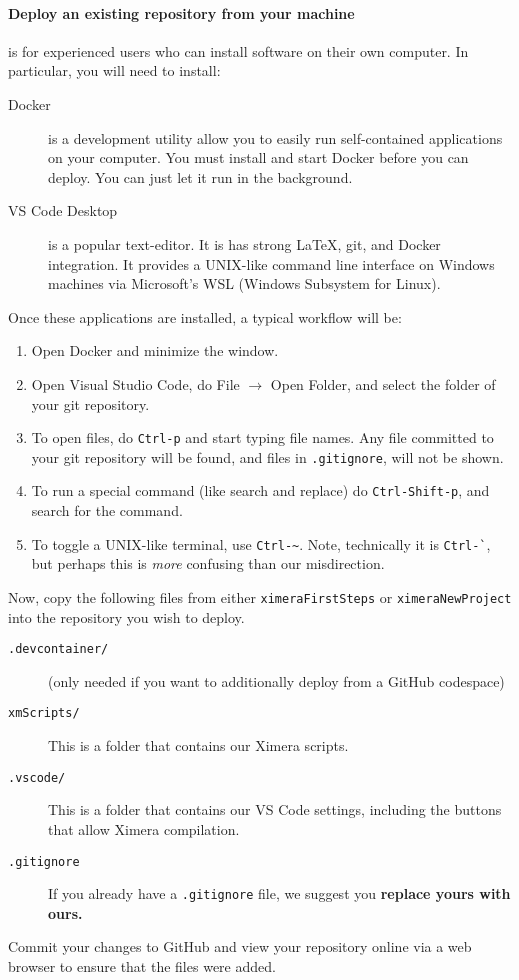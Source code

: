 \documentclass{ximera}
\begin{document}
\paragraph{Deploy an existing repository from your machine} is for experienced
users who can install software on their own computer. In particular, you will
need to install:
\begin{description}
    \item[Docker] is a development utility allow you to easily run
        self-contained applications on your
        computer. You must install and start Docker before you can deploy. You can just
        let
        it run in the background.
    \item[VS Code Desktop] is a popular text-editor. It is has strong \LaTeX, git,
        and Docker integration. It provides a UNIX-like command line interface on
        Windows machines via Microsoft's WSL (Windows Subsystem for Linux).
\end{description}
Once these applications are installed, a typical workflow will be:
\begin{enumerate}
    \item Open Docker and minimize the window.
    \item Open Visual Studio Code, do File $\to$ Open Folder, and select the
          folder of your git repository.
    \item To open files, do \verb!Ctrl-p! and start typing file names. Any
          file
          committed to your git repository will be found, and files in
          \verb!.gitignore!, will not be shown.
    \item To run a special command (like search and replace) do
          \verb!Ctrl-Shift-p!, and search for the command.
    \item To toggle a UNIX-like terminal, use \verb!Ctrl-~!. Note, technically
          it is \verb!Ctrl-`!, but perhaps this is \textit{more} confusing than our
          misdirection.
\end{enumerate}

Now, copy the following files from either \verb!ximeraFirstSteps! or
\verb!ximeraNewProject!
into the repository you wish to deploy.
\begin{description}
    \item[\texttt{.devcontainer/}] (only needed if you want to additionally
        deploy from
        a GitHub codespace)
    \item[\texttt{xmScripts/}] This is a folder that contains our Ximera
        scripts.
    \item[\texttt{.vscode/}] This is a folder that contains our VS Code
        settings, including the buttons that allow Ximera compilation.
    \item[\texttt{.gitignore}]	If you already have a \verb|.gitignore| file,
        we suggest
        you \textbf{replace yours with ours.}
\end{description}
Commit your changes to GitHub and view your repository online via a web browser
to ensure that the files were added.
\end{document}
